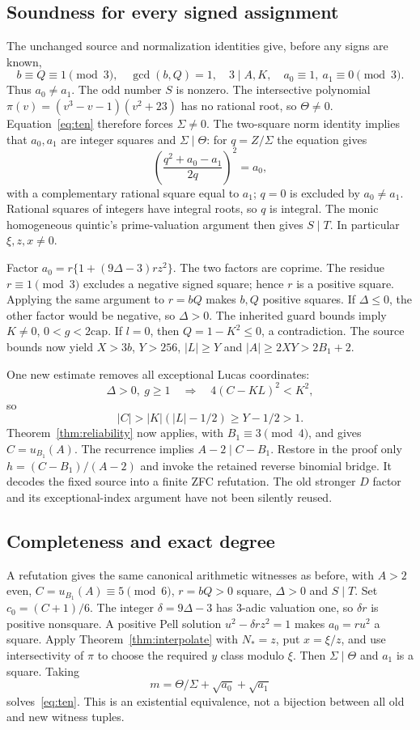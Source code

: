 \subsection{Soundness for every signed assignment}
The unchanged source and normalization identities give, before any signs
are known,
\[
 b\equiv Q\equiv1\pmod3,\quad \gcd(b,Q)=1,\quad3\mid A,K,
 \quad a_0\equiv1,\ a_1\equiv0\pmod3.
\]
Thus $a_0\ne a_1$. The odd number $S$ is nonzero. The intersective
polynomial $\pi(v)=(v^3-v-1)(v^2+23)$ has no rational root, so
$\Theta\ne0$. Equation~\eqref{eq:ten} therefore forces $\Sigma\ne0$.
The two-square norm identity implies that $a_0,a_1$ are integer squares
and $\Sigma\mid\Theta$: for $q=Z/\Sigma$ the equation gives
\[
 \left(\frac{q^2+a_0-a_1}{2q}\right)^2=a_0,
\]
with a complementary rational square equal to $a_1$; $q=0$ is excluded by
$a_0\ne a_1$. Rational squares of integers have integral roots, so $q$
is integral. The monic homogeneous quintic's prime-valuation argument
then gives $S\mid T$. In particular $\xi,z,x\ne0$.

Factor $a_0=r\{1+(9\Delta-3)rz^2\}$. The two factors are coprime.
The residue $r\equiv1\pmod3$ excludes a negative signed square; hence
$r$ is a positive square. Applying the same argument to $r=bQ$ makes
$b,Q$ positive squares. If $\Delta\le0$, the other factor would be
negative, so $\Delta>0$. The inherited guard bounds imply
$K\ne0$, $0<g<2\mathrm{cap}$. If $l=0$, then $Q=1-K^2\le0$,
a contradiction. The source bounds now yield $X>3b$, $Y>256$,
$|L|\ge Y$ and $|A|\ge2XY>2B_1+2$.

One new estimate removes all exceptional Lucas coordinates:
\[
 \Delta>0,\ g\ge1\quad\Longrightarrow\quad
 4(C-KL)^2<K^2,
\]
so
\[
 |C|>|K|(|L|-1/2)\ge Y-1/2>1.
\]
Theorem~\ref{thm:reliability} now applies, with
$B_1\equiv3\pmod4$, and gives $C=u_{B_1}(A)$.
The recurrence implies $A-2\mid C-B_1$. Restore in the proof only
$h=(C-B_1)/(A-2)$ and invoke the retained reverse binomial bridge.
It decodes the fixed source into a finite ZFC refutation. The old stronger
$D$ factor and its exceptional-index argument have not been silently reused.

\subsection{Completeness and exact degree}
A refutation gives the same canonical arithmetic witnesses as before,
with $A>2$ even, $C=u_{B_1}(A)\equiv5\pmod6$, $r=bQ>0$ square,
$\Delta>0$ and $S\mid T$. Set $c_0=(C+1)/6$.
The integer $\delta=9\Delta-3$ has 3-adic valuation one, so $\delta r$
is positive nonsquare. A positive Pell solution
$u^2-\delta rz^2=1$ makes $a_0=ru^2$ a square.
Apply Theorem~\ref{thm:interpolate} with $N_*=z$, put $x=\xi/z$, and
use intersectivity of $\pi$ to choose the required $y$ class modulo $\xi$.
Then $\Sigma\mid\Theta$ and $a_1$ is a square. Taking
\[
 m=\Theta/\Sigma+\sqrt{a_0}+\sqrt{a_1}
\]
solves~\eqref{eq:ten}. This is an existential equivalence, not a bijection
between all old and new witness tuples.

